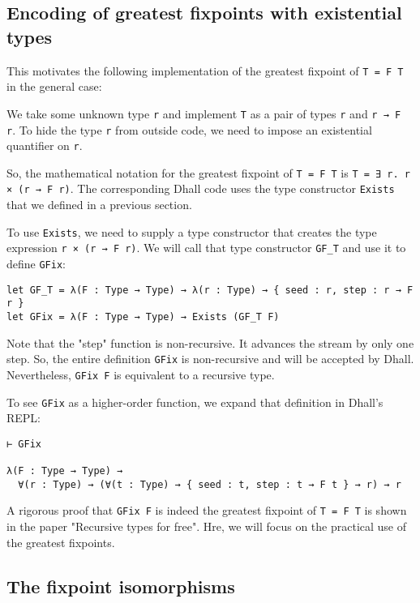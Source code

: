 \subsection{Encoding of greatest fixpoints with existential types}


This motivates the following implementation of the greatest fixpoint of \lstinline!T = F T! in the general case:


We take some unknown type \lstinline!r! and implement \lstinline!T! as a pair of types \lstinline!r! and \lstinline!r → F r!.
To hide the type \lstinline!r! from outside code, we need to impose an existential quantifier on \lstinline!r!.


So, the mathematical notation for the greatest fixpoint of \lstinline!T = F T! is \lstinline!T = ∃ r. r × (r → F r)!.
The corresponding Dhall code uses the type constructor \lstinline!Exists! that we defined in a previous section.


To use \lstinline!Exists!, we need to supply a type constructor that creates the type expression \lstinline!r × (r → F r)!.
We will call that type constructor \lstinline!GF_T! and use it to define \lstinline!GFix!:


\begin{lstlisting}[language=Dhall]
let GF_T = λ(F : Type → Type) → λ(r : Type) → { seed : r, step : r → F r }
let GFix = λ(F : Type → Type) → Exists (GF_T F)
\end{lstlisting}


Note that the "step" function is non-recursive.
It advances the stream by only one step.
So, the entire definition \lstinline!GFix! is non-recursive and will be accepted by Dhall.
Nevertheless, \lstinline!GFix F! is equivalent to a recursive type.


To see \lstinline!GFix! as a higher-order function, we expand that definition in Dhall's REPL:


\begin{lstlisting}[language=Dhall]
⊢ GFix

λ(F : Type → Type) →
  ∀(r : Type) → (∀(t : Type) → { seed : t, step : t → F t } → r) → r
\end{lstlisting}


A rigorous proof that \lstinline!GFix F! is indeed the greatest fixpoint of \lstinline!T = F T! is shown in the paper "Recursive types for free".
Hre, we will focus on the practical use of the greatest fixpoints.


\subsection{The fixpoint isomorphisms}


